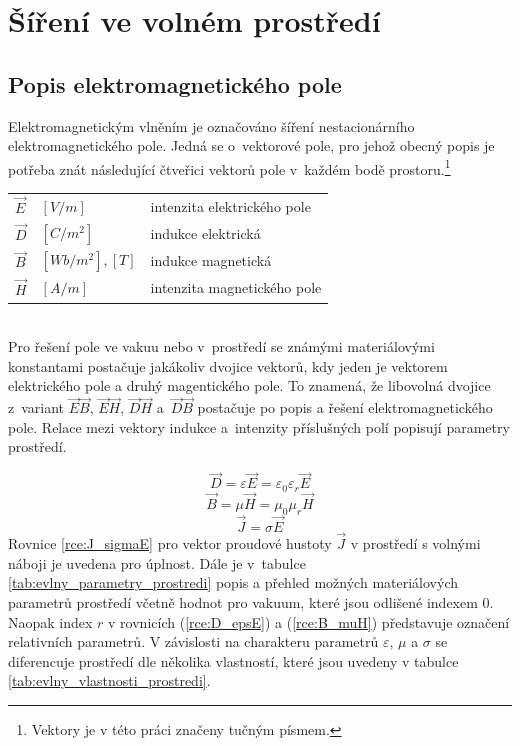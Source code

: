 
\section{Šíření ve volném prostředí} \label{sec:evlny_volne_prostredi}
\subsection{Popis elektromagnetického pole}
Elektromagnetickým vlněním je označováno šíření nestacionárního elektromagnetického pole. Jedná se o~vektorové pole, pro jehož obecný popis je potřeba znát následující čtveřici vektorů pole v~každém bodě prostoru.\footnote{Vektory je v této práci značeny tučným písmem.}\\ 

\begin{tabular}{lll}
$\vec E$ & $[V/m]$ & intenzita elektrického pole\\
$\vec D$ & $[C/m^{2}]$ & indukce elektrická\\
$\vec B$ & $[Wb/m^{2}],[T]$ & indukce magnetická\\
$\vec H$ & $[A/m]$ & intenzita magnetického pole\\
\end{tabular}\bigskip \\
Pro řešení pole ve vakuu nebo v~prostředí se známými materiálovými konstantami postačuje jakákoliv dvojice vektorů, kdy jeden je vektorem elektrického pole a druhý magentického pole. To znamená, že libovolná dvojice z~variant $\vec E\vec B$, $\vec E\vec H$, $\vec D\vec H$ a~$\vec D\vec B$ postačuje po popis a řešení elektromagnetického pole.
Relace mezi vektory indukce a~intenzity příslušných polí popisují parametry prostředí. 

\begin{equation}
	\vec D = \varepsilon\vec E = \varepsilon_{0}\varepsilon_{r}\vec E
	\label{rce:D_epsE}
\end{equation}
\begin{equation}
	\vec B = \mu\vec H = \mu_{0}\mu_{r}\vec H
	\label{rce:B_muH}
\end{equation}
\begin{equation}
	\vec J = \sigma\vec E
	\label{rce:J_sigmaE}
\end{equation}
Rovnice \ref{rce:J_sigmaE} pro vektor proudové hustoty $\vec J$ v prostředí s volnými náboji je uvedena pro úplnost. Dále je v~tabulce \ref{tab:evlny_parametry_prostredi} popis a přehled možných materiálových parametrů prostředí včetně hodnot pro vakuum, které jsou odlišené indexem $0$. Naopak index $r$ v rovnicích (\ref{rce:D_epsE}) a (\ref{rce:B_muH}) představuje označení relativních parametrů. V závislosti na charakteru parametrů $\varepsilon$, $\mu$ a $\sigma$ se diferencuje prostředí dle několika vlastností, které jsou uvedeny v tabulce \ref{tab:evlny_vlastnosti_prostredi}.

